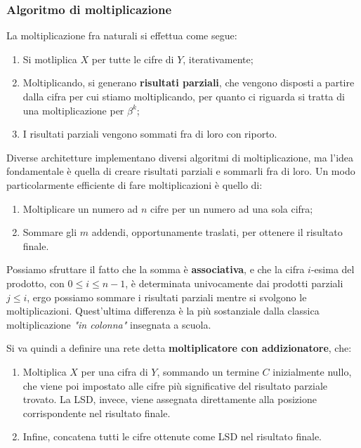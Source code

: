 \documentclass[a4paper,11pt]{article}
\begin{document}
\subsubsection{Algoritmo di moltiplicazione}
La moltiplicazione fra naturali si effettua come segue:

\begin{enumerate}
	\item Si motliplica $X$ per tutte le cifre di $Y$, iterativamente;
	\item Moltiplicando, si generano \textbf{risultati parziali}, che vengono disposti a partire dalla cifra per cui stiamo moltiplicando, per quanto ci riguarda si tratta di una moltiplicazione per $\beta^k$;
	\item I risultati parziali vengono sommati fra di loro con riporto.
\end{enumerate}

Diverse architetture implementano diversi algoritmi di moltiplicazione, ma l'idea fondamentale è quella di creare risultati parziali e sommarli fra di loro.
Un modo particolarmente efficiente di fare moltiplicazioni è quello di:
\begin{enumerate}
	\item Moltiplicare un numero ad $n$ cifre per un numero ad una sola cifra;
	\item Sommare gli $m$ addendi, opportunamente traslati, per ottenere il risultato finale.
\end{enumerate}

Possiamo sfruttare il fatto che la somma è \textbf{associativa}, e che la cifra $i$-esima del prodotto, con $0 \leq i \leq n - 1$, è determinata univocamente dai prodotti parziali $j \leq i$, ergo possiamo sommare i risultati parziali mentre si svolgono le moltiplicazioni. 
Quest'ultima differenza è la più sostanziale dalla classica moltiplicazione \textit{"in colonna"} insegnata a scuola.

Si va quindi a definire una rete detta \textbf{moltiplicatore con addizionatore}, che:
\begin{enumerate}
	\item Moltiplica $X$ per una cifra di $Y$, sommando un termine $C$ inizialmente nullo, che viene poi impostato alle cifre più significative del risultato parziale trovato.
		La LSD, invece, viene assegnata direttamente alla posizione corrispondente nel risultato finale.
	\item Infine, concatena tutti le cifre ottenute come LSD nel risultato finale.
\end{enumerate}
\end{document}
